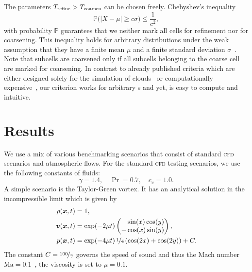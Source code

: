 \documentclass[runningheads]{llncs}
\begin{document}
The parameters $T_\text{refine} > T_\text{coarsen}$ can be chosen freely.
Chebyshev's inequality
\begin{equation}
  \label{eq:chebychev}
  \mathbb{P}\bigl(\vert X - \mu \vert \geq c \sigma \bigr) \leq \frac{1}{c^2},
\end{equation}
with probability $\mathbb{P}$ guarantees that we neither mark all cells for refinement nor for coarsening.
This inequality holds for arbitrary distributions under the weak assumption that they have a finite mean $\mu$ and a finite standard deviation $\sigma$~\cite{wasserman2004all}.
Note that subcells are coarsened only if all subcells belonging to the coarse cell are marked for coarsening.
In contrast to already published criteria which are either designed solely for the simulation of clouds~\cite{muller2010adaptive} or computationally expensive~\cite{fambri2017space}, our criterion works for arbitrary \pde{}s and yet, is easy to compute and intuitive.

\section{Results}
We use a mix of various benchmarking scenarios that consist of standard \textsc{cfd} scenarios and atmospheric flows.
%
For the standard \textsc{cfd} testing scenarios, we use the following constants of fluids:
\begin{equation}
  \gamma = 1.4, \quad \Pr = 0.7, \quad c_v = 1.0.
\end{equation}
A simple scenario is the Taylor-Green vortex.
It has an analytical solution in the incompressible limit which is given by
\begin{align}
  \label{eq:taylor-green}
  \begin{split}
  \rho(\bm{x}, t) &= 1,\\
  \bm{v}(\bm{x}, t) &= \exp(-2 \mu t)
  \begin{pmatrix}
    \phantom{-}\sin(x) \cos(y) \\
- \cos(x) \sin(y) 
    \end{pmatrix}, \\
  p(\bm{x}, t) &= \exp(-4 \mu t) \, \nicefrac{1}{4} \left( \cos(2x) + \cos(2y) \right) + C.
  \end{split}
\end{align}
The constant $C = \nicefrac{100}{\gamma}$ governs the speed of sound and thus the Mach number $\text{Ma} = 0.1$~\cite{dumbser2016high}, the viscosity is set to $\mu = 0.1$. 
\end{document}

